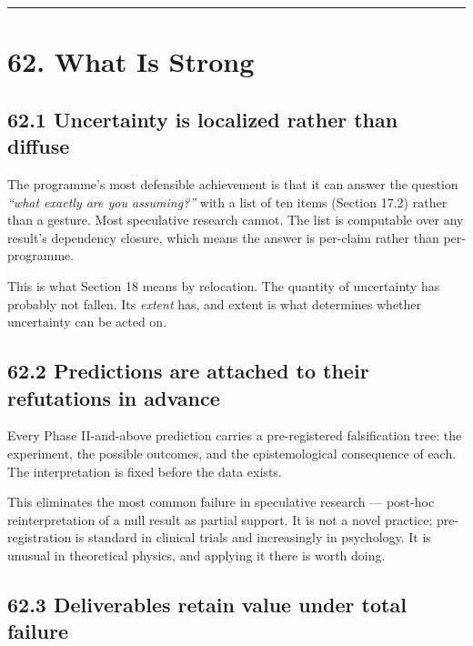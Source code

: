 \documentclass[
  11pt]{report}
\begin{document}
\begin{center}\rule{0.5\linewidth}{0.5pt}\end{center}

\hypertarget{what-is-strong}{%
\chapter{62. What Is Strong}\label{what-is-strong}}

\hypertarget{uncertainty-is-localized-rather-than-diffuse}{%
\section{62.1 Uncertainty is localized rather than
diffuse}\label{uncertainty-is-localized-rather-than-diffuse}}

The programme's most defensible achievement is that it can answer the
question \emph{``what exactly are you assuming?''} with a list of ten
items (Section 17.2) rather than a gesture. Most speculative research
cannot. The list is computable over any result's dependency closure,
which means the answer is per-claim rather than per-programme.

This is what Section 18 means by relocation. The quantity of uncertainty
has probably not fallen. Its \emph{extent} has, and extent is what
determines whether uncertainty can be acted on.

\hypertarget{predictions-are-attached-to-their-refutations-in-advance}{%
\section{62.2 Predictions are attached to their refutations in
advance}\label{predictions-are-attached-to-their-refutations-in-advance}}

Every Phase II-and-above prediction carries a pre-registered
falsification tree: the experiment, the possible outcomes, and the
epistemological consequence of each. The interpretation is fixed before
the data exists.

This eliminates the most common failure in speculative research ---
post-hoc reinterpretation of a null result as partial support. It is not
a novel practice; pre-registration is standard in clinical trials and
increasingly in psychology. It is unusual in theoretical physics, and
applying it there is worth doing.

\hypertarget{deliverables-retain-value-under-total-failure}{%
\section{62.3 Deliverables retain value under total
failure}\label{deliverables-retain-value-under-total-failure}}
\end{document}
